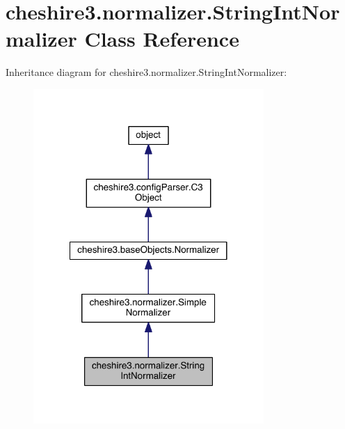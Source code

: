 \hypertarget{classcheshire3_1_1normalizer_1_1_string_int_normalizer}{\section{cheshire3.\-normalizer.\-String\-Int\-Normalizer Class Reference}
\label{classcheshire3_1_1normalizer_1_1_string_int_normalizer}
}


Inheritance diagram for cheshire3.\-normalizer.\-String\-Int\-Normalizer\-:
\nopagebreak
\begin{figure}[H]
\begin{center}
\leavevmode
\includegraphics[width=248pt]{classcheshire3_1_1normalizer_1_1_string_int_normalizer__inherit__graph}
\end{center}
\end{figure}


